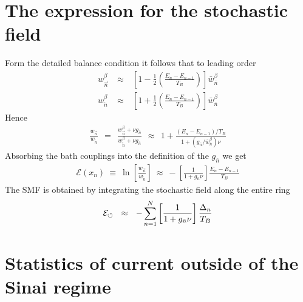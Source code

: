 \documentclass[aps,prl,floats,floatfix,twocolumn]{revtex4}
\newcommand{\mylabel}[1]{\label{#1}}
\newcommand{\beq}{\begin{eqnarray}}
\newcommand{\eeq}{\end{eqnarray}}
\newcommand{\be}[1]{\begin{eqnarray}\ifthenelse{#1=-1}
{\nonumber}{\ifthenelse{#1=0}{}{\mylabel{e#1}}}}
\newcommand{\ee}{\end{eqnarray}}
\begin{document}
\section{The expression for the stochastic field}

Form the detailed balance condition it follows that 
to leading order 
%
\beq
w^{\beta}_{\overrightarrow{n}} \ &\approx& \ \left[1-\frac{1}{2}\left(\frac{E_n-E_{n{-}1}}{T_B}\right)\right]\bar{w}_{\bar{n}}^{\beta} \\ 
w^{\beta}_{\overleftarrow{n}} \ &\approx& \ \left[1+\frac{1}{2}\left(\frac{E_n-E_{n{-}1}}{T_B}\right)\right]\bar{w}_{\bar{n}}^{\beta}
\eeq  
%
Hence
%
\beq
\frac{w_{\overrightarrow{n}}}{w_{\overleftarrow{n}}} 
\ \ = \ \ \frac{w^{\beta}_{\overrightarrow{n}}+\nu g_{\bar{n}}}{w^{\beta}_{\overleftarrow{n}}+\nu g_{\bar{n}}}
\ \ \approx \ \ 1+ \frac{(E_n-E_{n{-}1})/T_B}{1+(g_{\bar{n}}/\bar{w}_{\bar{n}}^{\beta})\nu}
\eeq
%
Absorbing the bath couplings into the definition of the $g_{\bar{n}}$ we get  
%
\beq
\mathcal{E}(x_n) \ \equiv \ \ln \left[\frac{w_{\overrightarrow{n}}}{w_{\overleftarrow{n}}}\right] 
\ \approx \ - \left[ \frac{1}{1+g_{\bar{n}}\nu} \right] \frac{E_n{-}E_{n{-}1}}{T_B}
\ee
%
The SMF is obtained by integrating the stochastic field along the entire ring 
%
\be{2001}
\mathcal{E}_{\circlearrowleft} 
\ \ \approx \ \  
-\sum_{n=1}^N \left[ \frac{1}{1+g_{\bar{n}}\nu} \right] \frac{\Delta_n}{T_B}
\eeq



\clearpage
\section{Statistics of current outside of the Sinai regime}
\end{document}
